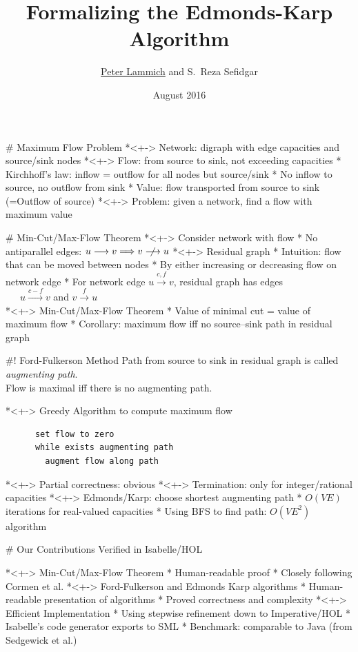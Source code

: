 \documentclass[fleqn]{beamer}
\title{Formalizing the Edmonds-Karp Algorithm}
\author[Peter Lammich]{\underline{Peter Lammich} and S.~Reza Sefidgar}
\institute[TUM] %
{ TU M\"unchen %
}
\date {August 2016}
\newcommand{\edge}[1]{\stackrel{#1}{\longrightarrow}}
\begin{document}
% 

\begin{frame}
  \titlepage
\end{frame}

# Maximum Flow Problem
  *<+-> Network: digraph with edge capacities and source/sink nodes
  *<+-> Flow: from source to sink, not exceeding capacities
    * Kirchhoff's law: inflow = outflow for all nodes but source/sink
    * No inflow to source, no outflow from sink
    * Value: flow transported from source to sink (=Outflow of source)
  *<+-> Problem: given a network, find a flow with maximum value

# Min-Cut/Max-Flow Theorem
  *<+-> Consider network with flow
    * No antiparallel edges: $u\edge{} v \implies v\centernot{\edge{}} u$
  *<+-> Residual graph
    * Intuition: flow that can be moved between nodes
      * By either increasing or decreasing flow on network edge
    * For network edge $u\edge{c,f} v$, residual graph has edges\\[1em]
      ~~~$u\edge{c-f} v$ and $v\edge{f} u$\\[1em]
  *<+-> Min-Cut/Max-Flow Theorem
    * Value of minimal cut = value of maximum flow
    * Corollary: maximum flow iff no source--sink path in residual graph

#! Ford-Fulkerson Method
  {}
  {\small{
    Path from source to sink in residual graph is called \emph{augmenting path}.\\
    Flow is maximal iff there is no augmenting path.
  }}
  \vfill

  *<+-> Greedy Algorithm to compute maximum flow
    \begin{lstlisting}
      set flow to zero
      while exists augmenting path
        augment flow along path
    \end{lstlisting}%
  *<+-> Partial correctness: obvious
  *<+-> Termination: only for integer/rational capacities
  *<+-> Edmonds/Karp: choose shortest augmenting path
    * $O(VE)$ iterations for real-valued capacities
    * Using BFS to find path: $O(VE^2)$ algorithm

# Our Contributions 
  {Verified in Isabelle/HOL}

  *<+-> Min-Cut/Max-Flow Theorem
    * Human-readable proof
    * Closely following Cormen et al.
  *<+-> Ford-Fulkerson and Edmonds Karp algorithms
    * Human-readable presentation of algorithms
    * Proved correctness and complexity
  *<+-> Efficient Implementation
    * Using stepwise refinement down to Imperative/HOL
    * Isabelle's code generator exports to SML
    * Benchmark: comparable to Java (from Sedgewick et al.)
\end{document}
